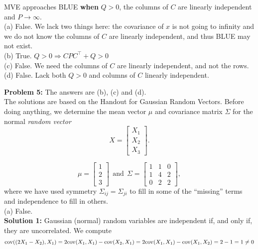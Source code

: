 \documentclass[letterpaper]{article}
\begin{document}
MVE approaches BLUE \textbf{when} $Q>0$, the columns of $C$ are linearly independent and $P \to \infty$.\\

(a) False. We lack two things here: the covariance of $x$ is not going to infinity and we do not know the columns of $C$ are linearly independent, and thus BLUE may not exist.\\

(b) True. $Q>0 \Rightarrow CPC^\top + Q >0$\\

(c) False.  We need the columns of $C$ are linearly independent, and not the rows.\\

(d) False. Lack both $Q>0$ and columns of $C$ linearly independent.\\

\newpage

\noindent \textbf{Problem 5:} The answers are (b), (c) and (d). \\

 The solutions are based on the Handout for Gaussian Random Vectors. Before doing anything, we determine the mean vector $\mu$ and covariance matrix $\Sigma$ for the normal \textit{random vector} $$ X = \begin{bmatrix} X_1 \\ X_2 \\ X_3  \end{bmatrix}.$$

$$\mu = \begin{bmatrix}1 \\ 2 \\ 3\end{bmatrix}~~\text{and}~~\Sigma =\begin{bmatrix} 1& 1 & 0\\  1& 4&2 \\ 0 & 2 & 2\end{bmatrix},$$
where we have used symmetry $\Sigma_{ij} = \Sigma_{ji}$ to fill in some of the ``missing'' terms and independence to fill in others.\\

(a) False. \\

\textbf{Solution 1:} Gaussian (normal) random variables are independent if, and only if, they are uncorrelated. We compute
$${\rm cov}((2X_1-X_2),X_1) = 2{\rm cov}(X_1,X_1)- {\rm cov}(X_2,X_1)=2{\rm cov}(X_1,X_1)- {\rm cov}(X_1,X_2)=2 - 1 = 1 \neq 0$$\\
\end{document}
